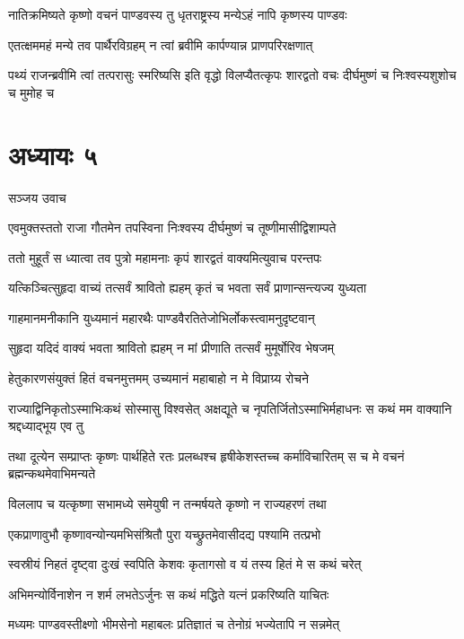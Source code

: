 \twolineshloka
{नातिक्रमिष्यते कृष्णो वचनं पाण्डवस्य तु}
{धृतराष्ट्रस्य मन्येऽहं नापि कृष्णस्य पाण्डवः}


\twolineshloka
{एतत्क्षममहं मन्ये तव पार्थैरविग्रहम्}
{न त्वां ब्रवीमि कार्पण्यान्न प्राणपरिरक्षणात्}


पथ्यं राजन्ब्रवीमि त्वां तत्परासुः स्मरिष्यसि
\twolineshloka
{इति वृद्धो विलप्यैतत्कृपः शारद्वतो वचः}
{दीर्घमुष्णं च निःश्वस्यशुशोच च मुमोह च}


\chapter{अध्यायः ५}
\twolineshloka
{सञ्जय उवाच}
{}


\twolineshloka
{एवमुक्तस्ततो राजा गौतमेन तपस्विना}
{निःश्वस्य दीर्घमुष्णं च तूष्णीमासीद्विशाम्पते}


\twolineshloka
{ततो मुहूर्तं स ध्यात्वा तव पुत्रो महामनाः}
{कृपं शारद्वतं वाक्यमित्युवाच परन्तपः}


\twolineshloka
{यत्किञ्चित्सुहृदा वाच्यं तत्सर्वं श्रावितो ह्यहम्}
{कृतं च भवता सर्वं प्राणान्सन्त्यज्य युध्यता}


\twolineshloka
{गाहमानमनीकानि युध्यमानं महारथैः}
{पाण्डवैरतितेजोभिर्लोकस्त्वामनुदृष्टवान्}


\twolineshloka
{सुहृदा यदिदं वाक्यं भवता श्रावितो ह्यहम्}
{न मां प्रीणाति तत्सर्वं मुमूर्षोरिव भेषजम्}


\twolineshloka
{हेतुकारणसंयुक्तं हितं वचनमुत्तमम्}
{उच्यमानं महाबाहो न मे विप्राग्र्य रोचने}


राज्याद्विनिकृतोऽस्माभिःकथं सोस्मासु विश्वसेत्
\twolineshloka
{अक्षद्यूते च नृपतिर्जितोऽस्माभिर्महाधनः}
{स कथं मम वाक्यानि श्रद्दध्याद्भूय एव तु}


\threelineshloka
{तथा दूत्येन सम्प्राप्तः कृष्णः पार्थहिते रतः}
{प्रलब्धश्च हृषीकेशस्तच्च कर्माविचारितम्}
{स च मे वचनं ब्रह्मन्कथमेवाभिमन्यते}


\twolineshloka
{विललाप च यत्कृष्णा सभामध्ये समेयुषी}
{न तन्मर्षयते कृष्णो न राज्यहरणं तथा}


\twolineshloka
{एकप्राणावुभौ कृष्णावन्योन्यमभिसंश्रितौ}
{पुरा यच्छ्रुतमेवासीदद्य पश्यामि तत्प्रभो}


\twolineshloka
{स्वस्रीयं निहतं दृष्ट्वा दुःखं स्वपिति केशवः}
{कृतागसो व यं तस्य हितं मे स कथं चरेत्}


\twolineshloka
{अभिमन्योर्विनाशेन न शर्म लभतेऽर्जुनः}
{स कथं मद्धिते यत्नं प्रकरिष्यति याचितः}


\twolineshloka
{मध्यमः पाण्डवस्तीक्ष्णो भीमसेनो महाबलः}
{प्रतिज्ञातं च तेनोग्रं भज्येतापि न सन्नमेत्}


